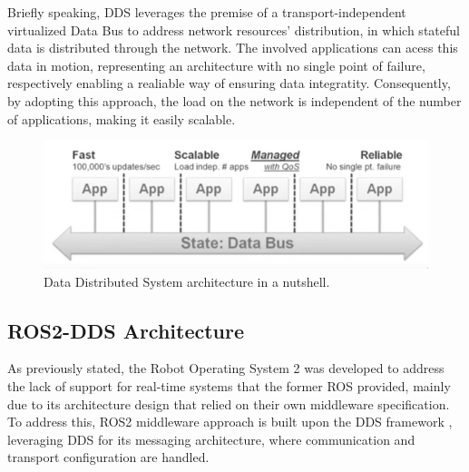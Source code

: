 
Briefly speaking, DDS leverages the premise of a transport-independent virtualized Data Bus to address network resources' distribution, in which stateful data is distributed through the network. The involved applications can acess this data in motion, representing an architecture with no single point of failure, respectively enabling a realiable way of ensuring data integratity. Consequently, by adopting this approach, the load on the network is independent of the number of applications, making it easily scalable. %

\begin{figure}[H]
    \centering
    \includegraphics[width=0.6\linewidth]{images/dds-architecture.png}
    \caption{Data Distributed System architecture in a nutshell.}
    \label{fig:dds-architecture-nutshell}
\end{figure}


\subsection{ROS2-DDS Architecture}

As previously stated, the Robot Operating System 2 was developed to address the lack of support for real-time systems that the former ROS provided, mainly due to its architecture design that relied on their own middleware specification. To address this, ROS2 middleware approach is built upon the DDS framework \cite{maruyama2016exploring}, leveraging DDS for its messaging architecture, where communication and transport configuration are handled. %

